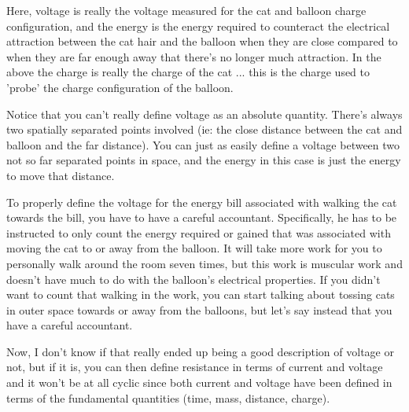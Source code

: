 Here, voltage is really the voltage measured for the cat and balloon charge configuration, and the energy is 
the energy required to counteract the electrical attraction between the cat hair and the balloon when they are close
compared to when they are far enough away that there's no longer much attraction.  In the above the charge is really
the charge of the cat ... this is the charge used to 'probe' the charge configuration of the balloon.

Notice that you can't really define voltage as an absolute quantity.  There's always two spatially separated points 
involved (ie: the close distance between the cat and balloon and the far distance).  You can just as easily define a
voltage between two not so far separated points in space, and the energy in this case is just the energy to move
that distance.

To properly define the voltage for the energy bill associated with walking the cat towards the bill, you have to have
a careful accountant.   Specifically, he has to be instructed to only count the energy required or gained that was
associated with moving the cat to or away from the balloon.  It will take more work for you to personally walk around the
room seven times, but this work is muscular work and doesn't have much to do with the balloon's electrical properties.
If you didn't want to count that walking in the work, you can start talking about tossing cats in outer space towards or 
away from the balloons, but let's say instead that you have a careful accountant.

Now, I don't know if that really ended up being a good description of voltage or not, but if it is, you can then define
resistance in terms of current and voltage and it won't be at all cyclic since both current and voltage have been defined
in terms of the fundamental quantities (time, mass, distance, charge).

%
